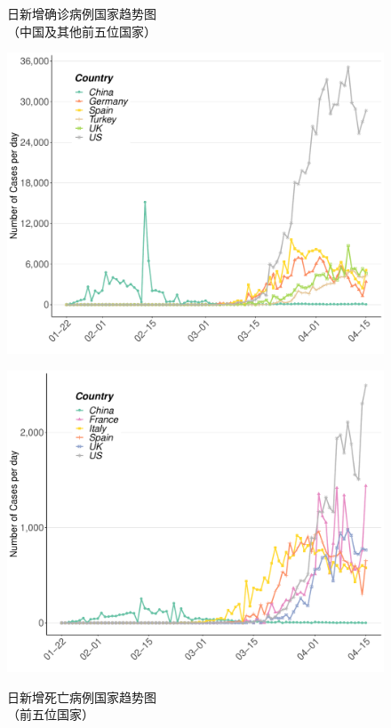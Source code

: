 \documentclass[
]{article}
\begin{document}
\begin{figure}[H]
\centering
\begin{minipage}[b]{0.45\linewidth}
\caption{日新增确诊病例国家趋势图\\（中国及其他前五位国家）}
\includegraphics[]{./input/covid2.pdf}
\label{}
\end{minipage}
\quad
\begin{minipage}[b]{0.45\linewidth}
\caption{日新增死亡病例国家趋势图\\（前五位国家） }
\includegraphics[]{./input/covid3.pdf}
\label{}
\end{minipage}
\end{figure}
\end{document}
